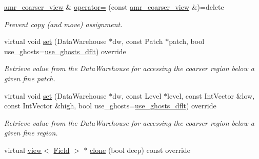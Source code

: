 \begin{DoxyCompactItemize}
\hyperlink{classUintah_1_1PhaseField_1_1detail_1_1amr__coarser__view}{amr\+\_\+coarser\+\_\+view} \& \hyperlink{classUintah_1_1PhaseField_1_1detail_1_1amr__coarser__view_3_01ScalarField_3_01T_01_4_00_01Proble9cadea116dab5bdb44bb3e29abbe99ef_a2e79e402bc0ccd6e06672f8f79fe4bda}{operator=} (const \hyperlink{classUintah_1_1PhaseField_1_1detail_1_1amr__coarser__view}{amr\+\_\+coarser\+\_\+view} \&)=delete
\begin{DoxyCompactList}\small\item\em Prevent copy (and move) assignment. \end{DoxyCompactList}\item 
virtual void \hyperlink{classUintah_1_1PhaseField_1_1detail_1_1amr__coarser__view_3_01ScalarField_3_01T_01_4_00_01Proble9cadea116dab5bdb44bb3e29abbe99ef_abe4876f94a9c77e38b7c3d434f86b3c0}{set} (Data\+Warehouse $\ast$dw, const Patch $\ast$patch, bool use\+\_\+ghosts=\hyperlink{classUintah_1_1PhaseField_1_1detail_1_1amr__coarser__view_3_01ScalarField_3_01T_01_4_00_01Proble9cadea116dab5bdb44bb3e29abbe99ef_ace77967592bbb525ac1e29555bb317cd}{use\+\_\+ghosts\+\_\+dflt}) override
\begin{DoxyCompactList}\small\item\em Retrieve value from the Data\+Warehouse for accessing the coarser region below a given fine patch. \end{DoxyCompactList}\item 
virtual void \hyperlink{classUintah_1_1PhaseField_1_1detail_1_1amr__coarser__view_3_01ScalarField_3_01T_01_4_00_01Proble9cadea116dab5bdb44bb3e29abbe99ef_a6e4dba1a59399d5ebc28800155fb4c06}{set} (Data\+Warehouse $\ast$dw, const Level $\ast$level, const Int\+Vector \&low, const Int\+Vector \&high, bool use\+\_\+ghosts=\hyperlink{classUintah_1_1PhaseField_1_1detail_1_1amr__coarser__view_3_01ScalarField_3_01T_01_4_00_01Proble9cadea116dab5bdb44bb3e29abbe99ef_ace77967592bbb525ac1e29555bb317cd}{use\+\_\+ghosts\+\_\+dflt}) override
\begin{DoxyCompactList}\small\item\em Retrieve value from the Data\+Warehouse for accessing the coarser region below a given fine region. \end{DoxyCompactList}\item 
virtual \hyperlink{classUintah_1_1PhaseField_1_1detail_1_1view}{view}$<$ \hyperlink{structUintah_1_1PhaseField_1_1ScalarField}{Field} $>$ $\ast$ \hyperlink{classUintah_1_1PhaseField_1_1detail_1_1amr__coarser__view_3_01ScalarField_3_01T_01_4_00_01Proble9cadea116dab5bdb44bb3e29abbe99ef_a125db112d5568827ed202d5e02610515}{clone} (bool deep) const override

\end{DoxyCompactItemize}
